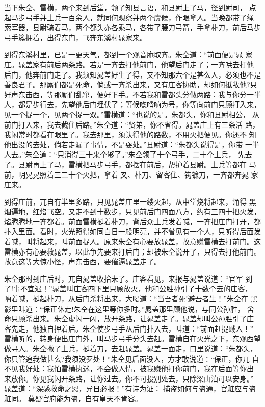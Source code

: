 当下朱仝、雷横，两个来到后堂，领了知县言语，和县尉上了马，径到尉司，
点起马步弓手并土兵一百余人，就同何观察并两个虞候，作眼拿人。当晚都带了绳
索军器，县尉骑着马，两个都头亦各乘马，各带了腰刀弓箭，手拿朴刀，前后马步
弓手簇拥着，出得东门，飞奔东溪村晁家来。

到得东溪村里，已是一更天气，都到一个观音庵取齐。朱仝道：“前面便是晁
家庄。晁盖家有前后两条路。若是一齐去打他前门，他望后门走了；一齐哄去打他
后门，他奔前门走了。我须知晁盖好生了得，又不知那六个是甚么人，必须也不是
善良君子。那厮们都是死命，倘或一齐杀出来，又有庄客协助，却如何抵敌他?只
好声东击西，等那厮们乱窜，便好下手。不若我和雷都头分做两路：我与你分一半
人，都是步行去，先望他后门埋伏了；等候唿哨响为号，你等向前门只顾打入来，
见一个捉一个，见两个捉一双。”雷横道：“也说的是。朱都头，你和县尉相公，
从前门打入来，我去截住后路。”朱仝道：“贤弟，你不省得。晁盖庄上有三条活
路，我闲常时都看在眼里了。我去那里，须认得他的路数，不用火把便见。你还不
知他出没的去处，倘若走漏了事情，不是耍处。”县尉道：“朱都头说得是，你带
一半人去。”朱仝道：“只消得三十来个够了。”朱仝领了十个弓手，二十个土兵，
先去了。县尉再上了马，雷横把马步弓手，都摆在前后，帮护着县尉。土兵等都在
马前，明晃晃照着三二十个火把，拿着叉、朴刀、留客住、钩镰刀，一齐都奔晁
家庄来。

到得庄前，兀自有半里多路，只见晁盖庄里一缕火起，从中堂烧将起来，涌得
黑烟遍地，红焰飞空。又走不到十数步，只见前后门四面八方，约有三四十把火发，
焰腾腾地一齐都着。前面雷横挺着朴刀，背后众土兵发着喊，一齐把庄门打开，都
扑入里面。看时，火光照得如同白日一般明亮，并不曾见有一个人，只听得后面发
着喊，叫将起来，叫前面捉人。原来朱仝有心要放晁盖，故意赚雷横去打前门。这
雷横亦有心要救晁盖，以此争先要来打后门；却被朱仝说开了，只得去打他前门。
故意这等大惊小怪，声东击西，要催逼晁盖走了。

朱仝那时到庄后时，兀自晁盖收拾未了。庄客看见，来报与晁盖说道：“官军
到了!事不宜迟！”晁盖叫庄客四下里只顾放火，他和公胜孙引了十数个去的庄客，
呐着喊，挺起朴刀，从后门杀将出来，大喝道：“当吾者死!避吾者生！”朱仝在
黑影里叫道：“保正休走!朱仝在这里等你多时。”晁盖那里顾他说，与同公孙胜，
舍命只顾杀出来。朱仝虚闪一闪，放开条路，让晁盖走了。晁盖却叫公孙胜引了庄
客先走，他独自押着后。朱仝使步弓手从后门扑入去，叫道：“前面赶捉贼人！”
雷横听的，转身便出庄门外，叫马步弓手分头去赶。雷横自在火光之下，东观西望
做寻人。朱仝撇了土兵，挺着刀，去赶晁盖。晁盖一面走，口里说道：“朱都头，
你只管追我做甚么?我须没歹处！”朱仝见后面没人，方才敢说道：“保正，你兀
自不见我好处：我怕雷横执迷，不会做人情，被我赚他打你前门，我在后面等你出
来放你。你见我闪开条路，让你过去。你不可投别处去，只除梁山泊可以安身。”
晁盖道：“深感救命之恩，异日必报！”有诗为证：
捕盗如何与盗通，官赃应与盗赃同。
莫疑官府能为盗，自有皇天不肯容。

